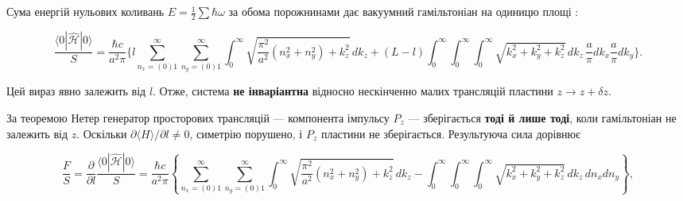 \documentclass[twoside, 10pt]{article}
\def\myvspacebeforesubsection{-2.0mm}
\def\myvspaceaftersubsection{-2.5mm}
\begin{document}
\begin{multicols}{2}
\vspace{\myvspacebeforesubsection}
\subsection*{}
\vspace{\myvspaceaftersubsection}


Сума енергій нульових коливань \(E=\frac12\sum\hbar\omega\) за обома порожнинами дає вакуумний
гамільтоніан на одиницю площі \cite{Drozdov2024}:

\end{multicols}

\[
\frac{\langle 0|\hat{\mathcal{H}}|0\rangle}{S} = \frac{\hbar c}{a^2\pi} \Bigg\{
l \sum_{n_x=(0)1}^{\infty}\sum_{n_y=(0)1}^{\infty}
\int_0^{\infty} \sqrt{ \frac{\pi^2}{a^2}(n_x^2 + n_y^2) + k_z^2 } \, dk_z
+ (L - l) \int_0^{\infty}\!\!\int_0^{\infty}
\int_0^{\infty} \sqrt{k_x^2 + k_y^2 + k_z^2} \, dk_z \, \frac{a}{\pi}dk_x \frac{a}{\pi}dk_y
\Bigg\}.
\]

\begin{multicols}{2}

Цей вираз явно залежить від \(l\). Отже, система \textbf{не інваріантна} відносно нескінченно
малих трансляцій пластини \(z\to z+\delta z\).

За теоремою Нетер генератор просторових трансляцій --- компонента імпульсу \(P_z\) ---
зберігається \textbf{тоді й лише тоді}, коли гамільтоніан не залежить від \(z\). Оскільки
\(\partial\langle H\rangle/\partial l\neq0\), симетрію порушено, і \(P_z\) пластини не зберігається.
Результуюча сила дорівнює

\end{multicols}

\[
\frac{F}{S} = \frac{\partial}{\partial l} \frac{\langle 0|\hat{\mathcal{H}}|0\rangle}{S}
= \frac{\hbar c}{a^2\pi} \left\{
\sum_{n_x=(0)1}^{\infty}\sum_{n_y=(0)1}^{\infty}
\int_0^{\infty} \sqrt{ \frac{\pi^2}{a^2}(n_x^2 + n_y^2) + k_z^2 } \, dk_z
- \int_0^{\infty}\!\!\int_0^{\infty}
\int_0^{\infty} \sqrt{k_x^2 + k_y^2 + k_z^2} \, dk_z \, dn_x dn_y
\right\},
\]
\end{document}
